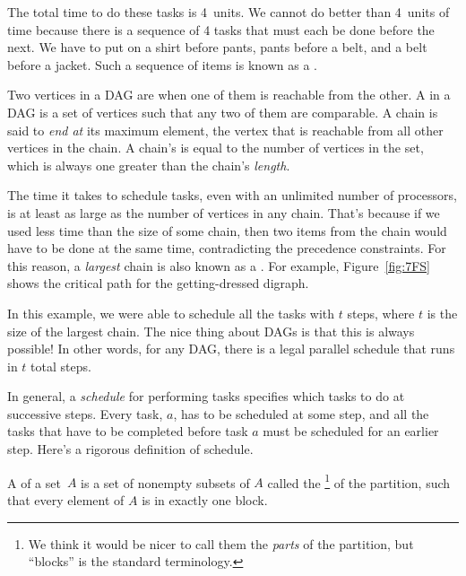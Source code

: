 The total time to do these tasks is 4~units.  We cannot do better than
4~units of time because there is a sequence of 4 tasks that must each
be done before the next.  We have to put on a shirt before pants,
pants before a belt, and a belt before a jacket.  Such a sequence of
items is known as a .

\begin{definition}
Two vertices in a DAG are  when one of them is
reachable from the other.  A  in a DAG is a set of
vertices such that any two of them are comparable.  A chain is said to
\emph{end at} its maximum element, the vertex that
is reachable from all other vertices in the chain.  A chain's
 is equal to the number of vertices in the set, which is
always one greater than the chain's \emph{length}.
\end{definition}

The time it takes to schedule tasks, even with an unlimited number of
processors, is at least as large as the number of vertices in any
chain.  That's because if we used less time than the size of some
chain, then two items from the chain would have to be done at the same
time, contradicting the precedence constraints.  For this reason, a
\emph{largest} chain is also known as a .  For
example, Figure~\ref{fig:7FS} shows the critical path for the
getting-dressed digraph.

In this example, we were able to schedule all the tasks with $t$
steps, where $t$ is the size of the largest chain.  The nice thing
about DAGs is that this is always possible!  In other words, for any
DAG, there is a legal parallel schedule that runs in $t$ total steps.

In general, a \emph{schedule} for performing tasks specifies which
tasks to do at successive steps.  Every task, $a$, has to be scheduled
at some step, and all the tasks that have to be completed before task
$a$ must be scheduled for an earlier step.  Here's a rigorous
definition of schedule.

\begin{definition}\label{def:partition}
A  of a set~$A$ is a set of nonempty subsets of $A$
called the \footnote{We think it would be nicer to call
  them the \emph{parts} of the partition, but ``blocks'' is the
  standard terminology.} of the partition, such that every element of
$A$ is in exactly one block.
\end{definition}

